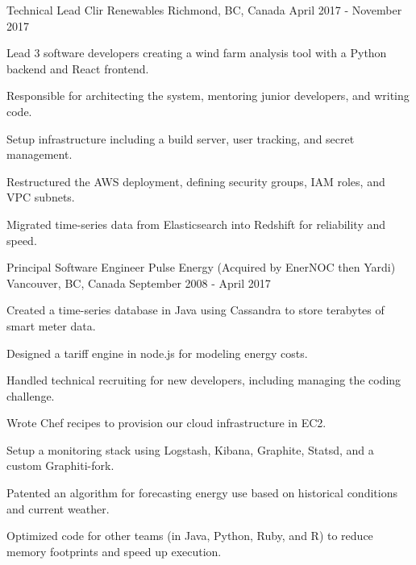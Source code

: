 \begin{cventries}

  \cventry
    {Technical Lead} %
    {Clir Renewables} %
    {Richmond, BC, Canada} %
    {April 2017 - November 2017} %
    {
      \begin{cvitems} %
        \item {Lead 3 software developers creating a wind farm analysis tool with a Python backend and React frontend.}
        \item {Responsible for architecting the system, mentoring junior developers, and writing code.}
        \item {Setup infrastructure including a build server, user tracking, and secret management.}
        \item {Restructured the AWS deployment, defining security groups, IAM roles, and VPC subnets.}
        \item {Migrated time-series data from Elasticsearch into Redshift for reliability and speed.}
      \end{cvitems}
    }


  \cventry
    {Principal Software Engineer} %
    {Pulse Energy (Acquired by EnerNOC then Yardi)} %
    {Vancouver, BC, Canada} %
    {September 2008 - April 2017} %
    {
      \begin{cvitems} %
        \item {Created a time-series database in Java using Cassandra to store terabytes of smart meter data.}
        \item {Designed a tariff engine in node.js for modeling energy costs.}
        \item {Handled technical recruiting for new developers, including managing the coding challenge.}
        \item {Wrote Chef recipes to provision our cloud infrastructure in EC2.}
        \item {Setup a monitoring stack using Logstash, Kibana, Graphite, Statsd, and a custom Graphiti-fork.}
        \item {Patented an algorithm for forecasting energy use based on historical conditions and current weather.}
        \item {Optimized code for other teams (in Java, Python, Ruby, and R) to reduce memory footprints and speed up execution.}
      \end{cvitems}
    }


\end{cventries}
